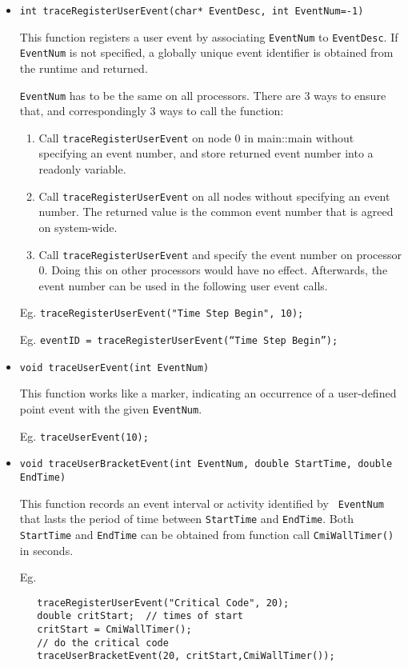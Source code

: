 \documentclass[10pt,dvips]{article}
\begin{document}
\begin{itemize}
\item
{\tt int traceRegisterUserEvent(char* EventDesc, int EventNum=-1) }

This function registers a user event by associating {\tt EventNum} to
{\tt EventDesc}. If {\tt EventNum} is not specified, a globally unique
event identifier is obtained from the runtime and returned.

{\tt EventNum} has to be the same on all processors. There are 3 ways
to ensure that, and correspondingly 3 ways to call the function:

\begin{enumerate}
\item
Call {\tt traceRegisterUserEvent} on node 0 in main::main without specifying
an event number, and store returned event number into a readonly variable.
\item
Call {\tt traceRegisterUserEvent} on all nodes without specifying an
event number. The returned value is the common event number that is
agreed on system-wide.
\item
Call {\tt traceRegisterUserEvent} and specify the event number on
processor 0. Doing this on other processors would have no
effect. Afterwards, the event number can be used in the following user
event calls.
\end{enumerate}

Eg. {\tt traceRegisterUserEvent("Time Step Begin", 10);}

Eg. {\tt eventID = traceRegisterUserEvent(``Time Step Begin'');}

\item
{\tt void traceUserEvent(int EventNum) }

This function works like a marker, indicating an occurrence of a
user-defined point event with the given {\tt EventNum}.

Eg. {\tt traceUserEvent(10);}

\item
{\tt void traceUserBracketEvent(int EventNum, double StartTime, double EndTime) }

This function records an event interval or activity identified by {\tt
EventNum} that lasts the period of time between {\tt StartTime} and
{\tt EndTime}. Both {\tt StartTime} and {\tt EndTime} can be obtained
from function call {\tt CmiWallTimer()} in seconds.

Eg.
\begin{verbatim}
   traceRegisterUserEvent("Critical Code", 20);
   double critStart;  // times of start
   critStart = CmiWallTimer();
   // do the critical code
   traceUserBracketEvent(20, critStart,CmiWallTimer());
\end{verbatim}

\end{itemize}
\end{document}
